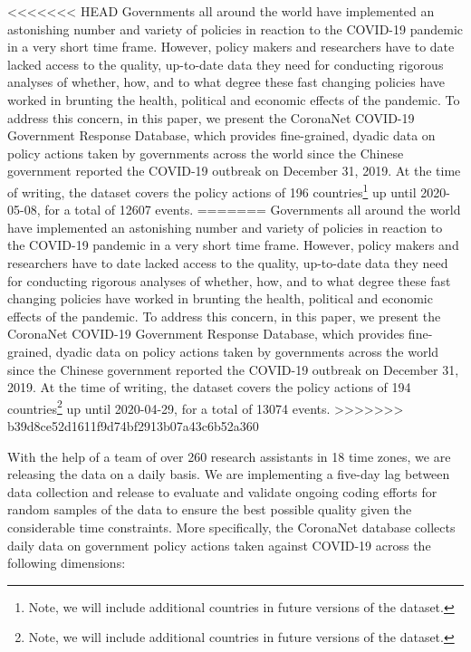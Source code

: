 \documentclass[]{article}
\let\rmarkdownfootnote\footnote%
\def\footnote{\protect\rmarkdownfootnote}
\begin{document}
<<<<<<< HEAD
Governments all around the world have implemented an astonishing number and variety of policies in reaction to the COVID-19 pandemic in a very short time frame. However, policy makers and researchers have to date lacked access to the quality, up-to-date data they need for conducting rigorous analyses of whether, how, and to what degree these fast changing policies have worked in brunting the health, political and economic effects of the pandemic. To address this concern, in this paper, we present the CoronaNet COVID-19 Government Response Database, which provides fine-grained, dyadic data on policy actions taken by governments across the world since the Chinese government reported the COVID-19 outbreak on December 31, 2019. At the time of writing, the dataset covers the policy actions of 196 countries\footnote{Note, we will include additional countries in future versions of the dataset.} up until 2020-05-08, for a total of 12607 events.
=======
Governments all around the world have implemented an astonishing number and variety of policies in reaction to the COVID-19 pandemic in a very short time frame. However, policy makers and researchers have to date lacked access to the quality, up-to-date data they need for conducting rigorous analyses of whether, how, and to what degree these fast changing policies have worked in brunting the health, political and economic effects of the pandemic. To address this concern, in this paper, we present the CoronaNet COVID-19 Government Response Database, which provides fine-grained, dyadic data on policy actions taken by governments across the world since the Chinese government reported the COVID-19 outbreak on December 31, 2019. At the time of writing, the dataset covers the policy actions of 194 countries\footnote{Note, we will include additional countries in future versions of the dataset.} up until 2020-04-29, for a total of 13074 events.
>>>>>>> b39d8ce52d1611f9d74bf2913b07a43c6b52a360

With the help of a team of over 260 research assistants in 18 time zones, we are releasing the data on a daily basis. We are implementing a five-day lag between data collection and release to evaluate and validate ongoing coding efforts for random samples of the data to ensure the best possible quality given the considerable time constraints. More specifically, the CoronaNet database collects daily data on government policy actions taken against COVID-19 across the following dimensions:
\end{document}
